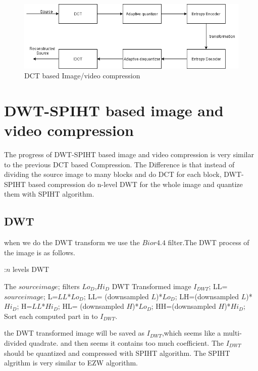 \documentclass[twocolumn]{article}  %
\begin{document}
\begin{figure}[ht]
\centering
\includegraphics[scale=0.42]{flowDiagram.png}
\caption{DCT based Image/video compression}
\label{fig:1}
\end{figure}

\section {DWT-SPIHT based image and video compression}

The progress of DWT-SPIHT based image and video compression is very similar to the previous DCT based Compression. The Difference is that instead of dividing the source image to many blocks and do DCT for each block, DWT-SPIHT based compression do n-level DWT for the whole image and quantize them with SPIHT algorithm. 
\subsection{DWT}
when we do the DWT transform we use the $Bior 4.4$ filter.\cite{PCA}The DWT process of the image is as follows.

\begin{algorithm} 
  \caption{:$n$ levels DWT}
	\begin{algorithmic}
	\Require
      The $source image$;
	 filters $Lo_D$,$Hi_D$
    \Ensure
     	 DWT Transformed image $I_{DWT}$;
	\State	
	LL=$source image$;
	\State L=$LL$*$Lo_D$;
	\State LL=	(downsampled $L$)*$Lo_D$;
	\State LH=(downsampled $L$)*$Hi_D$;
	\State H=$LL$*$Hi_D$;
	\State HL=	(downsampled $H$)*$Lo_D$;
	\State HH=(downsampled $H$)*$Hi_D$;
	\State Sort each computed part in to $I_{DWT}$.
    \EndFor	
	\end{algorithmic}
\end{algorithm} 
the DWT transformed image will be saved as $I_{DWT}$,which seems like a multi-divided quadrate. and then seems it contains too much coefficient. The $I_{DWT}$ should be quantized and compressed with SPIHT algorithm. The SPIHT algrithm is very similar to EZW algorithm.
  
\end{document}
